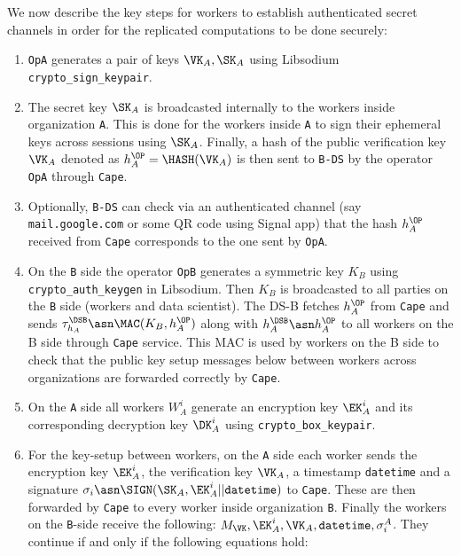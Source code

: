 We now describe the key steps for workers to establish authenticated secret
channels in order for the replicated computations to be done securely:
\begin{enumerate}
  \item \verb|OpA| generates a pair of keys $\VK_A, \SK_A$
  using Libsodium \verb|crypto_sign_keypair|.
  \item The secret key $\SK_A$ is broadcasted internally to the workers
  inside organization \verb|A|.  This is done for the workers inside \verb|A|
  to sign their ephemeral keys across sessions using $\SK_A$.  Finally, a
  hash of the public verification key $\VK_A$ denoted as $h_A^\OP =
  \HASH(\VK_A)$ is then sent to \verb|B-DS| by the operator \verb|OpA|
  through \verb|Cape|.
  
  \item Optionally, \verb|B-DS| can check via an authenticated channel (say
  \verb|mail.google.com| or some QR code using Signal app) that the hash $h_A^\OP$ received
  from \verb|Cape| corresponds to the one sent by \verb|OpA|.

  \item On the \verb|B| side the operator \verb|OpB| generates a symmetric key $K_B$
  using \verb|crypto_auth_keygen| in Libsodium.
  Then $K_B$ is broadcasted to all parties on the \verb|B| side (workers and
  data scientist).
  The DS-B fetches $h_A^\OP$ from \verb|Cape| and sends $\tau_{h_A}^\DSB \asn
  \MAC(K_B, h_A^\OP)$ along with $h_A^\DSB \asn h_A^\OP$ to all workers on the B side
  through \verb|Cape| service. This MAC is used by workers on the B side to check
  that the public key setup messages below between workers across organizations are
  forwarded correctly by \verb|Cape|.

  \item On the \verb|A| side all workers $W_A^i$ generate an encryption key $\EK_A^i$ and
  its corresponding decryption key $\DK_A^i$ using \verb|crypto_box_keypair|.

  \item For the key-setup between workers, on the \verb|A| side each worker
  sends the encryption key $\EK_A^i$, the verification key $\VK_A$, a
  timestamp \verb|datetime| and a signature $\sigma_i \asn \SIGN(\SK_A,
  \EK_A^i || \verb|datetime|)$ to \verb|Cape|.  These are then forwarded by \verb|Cape|
  to every worker inside organization \verb|B|.  Finally the workers on the
  \verb|B|-side receive the following: $M_\VK, \EK_A^i, \VK_A,
  \verb|datetime|, \sigma^A_i$.  They continue if and only if the following equations
  hold:
  

\end{enumerate}
